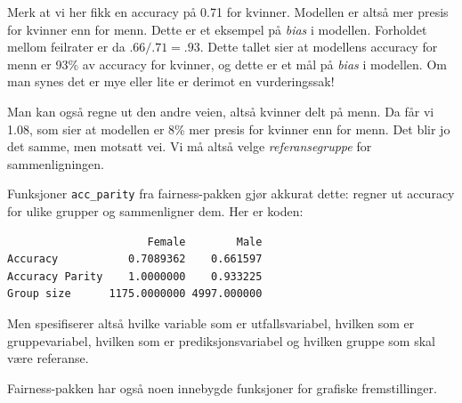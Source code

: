 \documentclass[
  letterpaper,
  DIV=11,
  numbers=noendperiod]{scrreprt}
\newenvironment{Shaded}{\begin{snugshade}}{\end{snugshade}}
\newcommand{\AttributeTok}[1]{\textcolor[rgb]{0.40,0.45,0.13}{#1}}
\newcommand{\FunctionTok}[1]{\textcolor[rgb]{0.28,0.35,0.67}{#1}}
\newcommand{\NormalTok}[1]{\textcolor[rgb]{0.00,0.23,0.31}{#1}}
\newcommand{\OtherTok}[1]{\textcolor[rgb]{0.00,0.23,0.31}{#1}}
\newcommand{\SpecialCharTok}[1]{\textcolor[rgb]{0.37,0.37,0.37}{#1}}
\newcommand{\StringTok}[1]{\textcolor[rgb]{0.13,0.47,0.30}{#1}}
\begin{document}
Merk at vi her fikk en accuracy på 0.71 for kvinner. Modellen er altså
mer presis for kvinner enn for menn. Dette er et eksempel på \emph{bias}
i modellen. Forholdet mellom feilrater er da \(.66/.71 = .93\). Dette
tallet sier at modellens accuracy for menn er 93\% av accuracy for
kvinner, og dette er et mål på \emph{bias} i modellen. Om man synes det
er mye eller lite er derimot en vurderingssak!

Man kan også regne ut den andre veien, altså kvinner delt på menn. Da
får vi 1.08, som sier at modellen er 8\% mer presis for kvinner enn for
menn. Det blir jo det samme, men motsatt vei. Vi må altså velge
\emph{referansegruppe} for sammenligningen.

Funksjoner \texttt{acc\_parity} fra fairness-pakken gjør akkurat dette:
regner ut accuracy for ulike grupper og sammenligner dem. Her er koden:

\begin{Shaded}
\end{Shaded}

\begin{verbatim}
                      Female        Male
Accuracy           0.7089362    0.661597
Accuracy Parity    1.0000000    0.933225
Group size      1175.0000000 4997.000000
\end{verbatim}

Men spesifiserer altså hvilke variable som er utfallsvariabel, hvilken
som er gruppevariabel, hvilken som er prediksjonsvariabel og hvilken
gruppe som skal være referanse.

Fairness-pakken har også noen innebygde funksjoner for grafiske
fremstillinger.

\begin{Shaded}
\end{Shaded}
\end{document}
